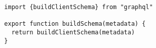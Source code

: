 \begin{verbatim}
  import {buildClientSchema} from "graphql"

  export function buildSchema(metadata) {
    return buildClientSchema(metadata)
  }
\end{verbatim}
